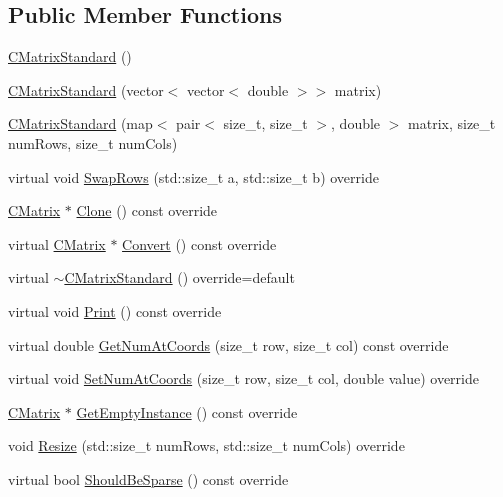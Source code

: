 \subsection*{Public Member Functions}
\begin{DoxyCompactItemize}
\item 
\hyperlink{classCMatrixStandard_ad862ccde0cbe3a1f72e724091040475d}{C\+Matrix\+Standard} ()
\item 
\hyperlink{classCMatrixStandard_a5ae792cb1f82cfd0f8710f22e6c03588}{C\+Matrix\+Standard} (vector$<$ vector$<$ double $>$$>$ matrix)
\item 
\hyperlink{classCMatrixStandard_ae2f8784f0d63aab266bbd144c5cc10c6}{C\+Matrix\+Standard} (map$<$ pair$<$ size\+\_\+t, size\+\_\+t $>$, double $>$ matrix, size\+\_\+t num\+Rows, size\+\_\+t num\+Cols)
\item 
virtual void \hyperlink{classCMatrixStandard_a8c8a6ce02302a423928b725e41c7730a}{Swap\+Rows} (std\+::size\+\_\+t a, std\+::size\+\_\+t b) override
\item 
\hyperlink{classCMatrix}{C\+Matrix} $\ast$ \hyperlink{classCMatrixStandard_a30885c9a67bfe07b8379f7dd7a782ce4}{Clone} () const override
\item 
virtual \hyperlink{classCMatrix}{C\+Matrix} $\ast$ \hyperlink{classCMatrixStandard_a73f39b1ac5602dbd233df469ba8f0c3b}{Convert} () const override
\item 
virtual \hyperlink{classCMatrixStandard_af1c8dfb0c0bdc2933fe19dc7deef0a80}{$\sim$\+C\+Matrix\+Standard} () override=default
\item 
virtual void \hyperlink{classCMatrixStandard_a0ace6054f9ec1fb2b26e0683034e48bd}{Print} () const override
\item 
virtual double \hyperlink{classCMatrixStandard_a277c77a453dccdac55de180bb63a8a7f}{Get\+Num\+At\+Coords} (size\+\_\+t row, size\+\_\+t col) const override
\item 
virtual void \hyperlink{classCMatrixStandard_a7fe5561630fbc65f7aeac5bd54499c13}{Set\+Num\+At\+Coords} (size\+\_\+t row, size\+\_\+t col, double value) override
\item 
\hyperlink{classCMatrix}{C\+Matrix} $\ast$ \hyperlink{classCMatrixStandard_a17e51335d1d9e731441a8205536697f7}{Get\+Empty\+Instance} () const override
\item 
void \hyperlink{classCMatrixStandard_ad135e13127c58f91c325a131d1dc8a74}{Resize} (std\+::size\+\_\+t num\+Rows, std\+::size\+\_\+t num\+Cols) override
\item 
virtual bool \hyperlink{classCMatrixStandard_a603dcb22f4cdf94438d4e59fe44870e4}{Should\+Be\+Sparse} () const override
\end{DoxyCompactItemize}
